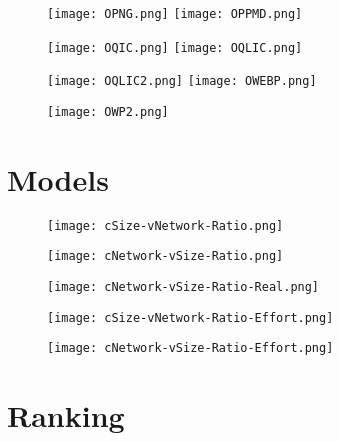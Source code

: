\documentclass[11pt,a4paper]{report}
\begin{document}
\begin{figure}[ht!]
\centering
\texttt{[image: OPNG.png]}
\texttt{[image: OPPMD.png]}
\end{figure}

\begin{figure}[ht!]
\centering
\texttt{[image: OQIC.png]}
\texttt{[image: OQLIC.png]}
\end{figure}

\begin{figure}[ht!]
\centering
\texttt{[image: OQLIC2.png]}
\texttt{[image: OWEBP.png]}
\end{figure}

\begin{figure}[ht!]
\centering
\texttt{[image: OWP2.png]}
\end{figure}

\chapter{Models\label{app:models}}

\begin{figure}[ht!]
\centering
\texttt{[image: cSize-vNetwork-Ratio.png]}
\end{figure}

\begin{figure}[ht!]
\centering
\texttt{[image: cNetwork-vSize-Ratio.png]}
\end{figure}

\begin{figure}[ht!]
\centering
\texttt{[image: cNetwork-vSize-Ratio-Real.png]}
\end{figure}

\begin{figure}[ht!]
\centering
\texttt{[image: cSize-vNetwork-Ratio-Effort.png]}
\end{figure}

\begin{figure}[ht!]
\centering
\texttt{[image: cNetwork-vSize-Ratio-Effort.png]}
\end{figure}

\chapter{Ranking\label{app:ranks}}
\end{document}
